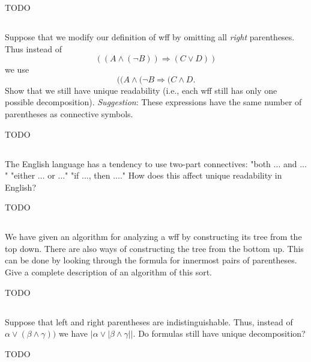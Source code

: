 \documentclass{report}
\begin{document}
  \begin{answer}
    TODO
  \end{answer}

\subsection{}%

  Suppose that we modify our definition of wff by omitting all \textit{right}
    parentheses.
  Thus instead of
    $$((A \land (\neg B)) \Rightarrow (C \lor D))$$
    we use $$((A \land (\neg B \Rightarrow (C \land D.$$
  Show that we still have unique readability (i.e., each wff still has only one
    possible decomposition).
  \textit{Suggestion}: These expressions have the same number of parentheses as
    connective symbols.

  \begin{answer}
    TODO
  \end{answer}

\subsection{}%

  The English language has a tendency to use two-part connectives: "both
    $\ldots$ and $\ldots$" "either $\ldots$ or $\ldots$" "if $\ldots$, then
    $\ldots$."
  How does this affect unique readability in English?

  \begin{answer}
    TODO
  \end{answer}

\subsection{}%

  We have given an algorithm for analyzing a wff by constructing its tree from
    the top down.
  There are also ways of constructing the tree from the bottom up.
  This can be done by looking through the formula for innermost pairs of
    parentheses.
  Give a complete description of an algorithm of this sort.

  \begin{answer}
    TODO
  \end{answer}

\subsection{}%

  Suppose that left and right parentheses are indistinguishable.
  Thus, instead of $\alpha \lor (\beta \land \gamma))$ we have
    $|\alpha \lor |\beta \land \gamma||$.
  Do formulas still have unique decomposition?

  \begin{answer}
    TODO
  \end{answer}
\end{document}
